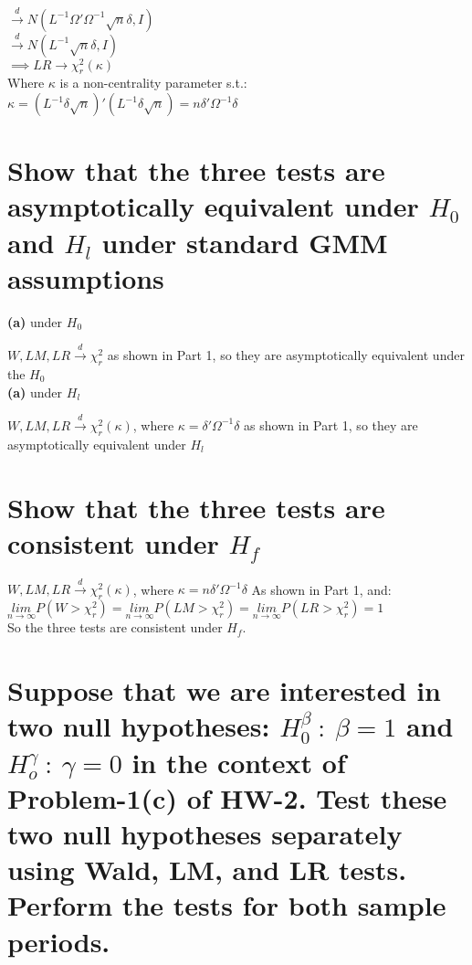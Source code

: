\documentclass[11pt]{article}
\theoremstyle{definition}
\def\indist{\stackrel{d}{\rightarrow}}
\begin{document}
\hspace{37mm} $\indist N(L^{-1}\Omega'\Omega^{-1}\sqrt{n}\delta, I)$ \\

\hspace{37mm} $\indist N(L^{-1}\sqrt{n}\delta, I)$ \\

$\implies LR \rightarrow \chi_{r}^{2}(\kappa)$ \\

Where $\kappa$ is a non-centrality parameter s.t.: \\

$\kappa=\left(L^{-1}\delta\sqrt{n}\right)'\left(L^{-1}\delta\sqrt{n}\right)=n\delta'\Omega^{-1}\delta$ \\


\section{Show that the three tests are asymptotically equivalent under $H_{0}$ and $H_{l}$ under standard GMM assumptions}

\textbf{(a)} under $H_{0}$

$W,LM,LR \indist \chi_{r}^{2}$ as shown in Part 1, so they are asymptotically equivalent under the $H_{0}$ \\

\noindent
\textbf{(a)} under $H_{l}$

$W,LM,LR \indist \chi_{r}^{2}(\kappa)$, where $\kappa=\delta'\Omega^{-1}\delta$ as shown in Part 1, so they are asymptotically equivalent under $H_{l}$

\section{Show that the three tests are consistent under $H_{f}$}


$W,LM,LR \indist \chi_{r}^{2}(\kappa)$, where $\kappa=n\delta'\Omega^{-1}\delta$ As shown in Part 1, and: \\

$\underset{n\rightarrow\infty}{lim}P\left(W>\chi_{r}^{2}\right)=\underset{n\rightarrow\infty}{lim}P\left(LM>\chi_{r}^{2}\right)=\underset{n\rightarrow\infty}{lim}P\left(LR>\chi_{r}^{2}\right)=1$ \\

So the three tests are consistent under $H_{f}$.

\section{Suppose that we are interested in two null hypotheses: $H_{0}^{\beta} \ : \ \beta=1$ and $H_{o}^{\gamma} \ : \ \gamma=0$ in the context of Problem-1(c) of HW-2. Test these two null hypotheses separately using Wald, LM, and LR tests.  Perform the tests for both sample periods.}
\end{document}
